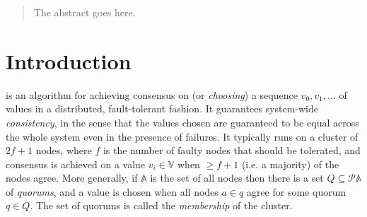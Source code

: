 \documentclass[journal]{IEEEtran}
\begin{document}







\maketitle

\begin{abstract}
The abstract goes here. %
\end{abstract}







%
\IEEEpeerreviewmaketitle

\section{Introduction}

 is an algorithm for achieving consensus on (or
\textit{choosing}) a sequence $v_0, v_1, \ldots$ of values in a distributed,
fault-tolerant fashion. It guarantees system-wide \textit{consistency}, in the
sense that the values chosen are guaranteed to be equal across the whole system
even in the presence of failures. It typically runs on a cluster of $2f+1$
nodes, where $f$ is the number of faulty nodes that should be tolerated, and
consensus is achieved on a value $v_i \in \mathbb V$ when $\ge f+1$ (i.e.  a
majority) of the nodes agree.  More generally, if $\mathbb A$ is the set of all
nodes then there is a set $Q \subseteq \mathcal P \mathbb A$ of
\textit{quorums}, and a value is chosen when all nodes $a \in q$ agree for some
quorum $q \in Q$. The set of quorums is called the \textit{membership} of the
cluster.
\end{document}
